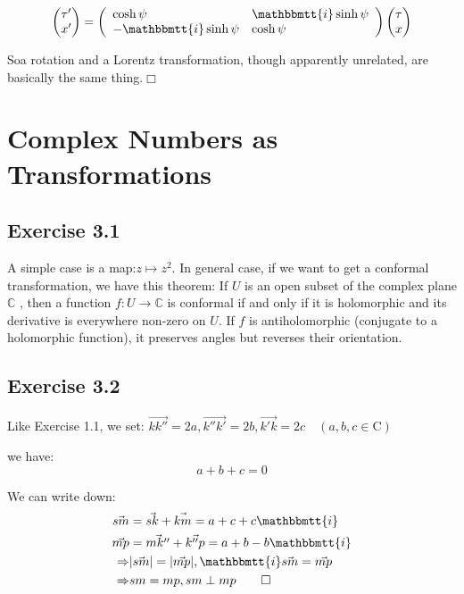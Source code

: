 \documentclass[]{ctexart}
\newcommand{\mi}{\mathbbmtt{i}}
\begin{document}
			\begin{equation*}
			\begin{aligned}
				\begin{pmatrix}
				\tau'\\
				x'
				\end{pmatrix}
				=
				\left(\begin{array}{ll}
				\cosh \psi & \mi \sinh \psi \\
				-\mi \sinh \psi & \cosh \psi
				\end{array}\right)
				\begin{pmatrix}
				\tau\\
				x
				\end{pmatrix}
			\end{aligned}
			\end{equation*}
			
		Soa rotation and a Lorentz transformation, though apparently unrelated, are basically the same thing.\qquad $\Box$
			
\section{Complex Numbers as Transformations}
	\subsection{Exercise 3.1}
		A simple case is a map:$z\mapsto z^2$. In general case, if we want to get a conformal transformation, we have this theorem: If $ U $ is an open subset of the complex plane  $ \mathbb {C} $ , then a function $f: U\rightarrow \mathbb{C}$ is conformal if and only if it is holomorphic and its derivative is everywhere non-zero on $U$. If $f$ is antiholomorphic (conjugate to a holomorphic function), it preserves angles but reverses their orientation. 
		
	\subsection{Exercise 3.2}
		Like Exercise 1.1, we set: $\vec{kk''}=2a,\vec{k''k'}=2b,\vec{k'k}=2c\quad(a,b,c\in \mathrm{C})$
		
		we have:
			\begin{equation*}
				a+b+c=0
			\end{equation*}
		
		We can write down:
			\begin{equation*}
			\begin{aligned}
				\vec{sm}&=\vec{sk}+\vec{km}=a+c+c\mi\\
				\vec{mp}&=\vec{mk''}+\vec{k''p}=a+b-b\mi\\
				\Rightarrow & |\vec{sm}|=|\vec{mp}|,\mi \vec{sm}=\vec{mp}\\
				\Rightarrow & sm=mp,sm \perp mp\qquad \Box
			\end{aligned}
			\end{equation*} 
	
\end{document}
